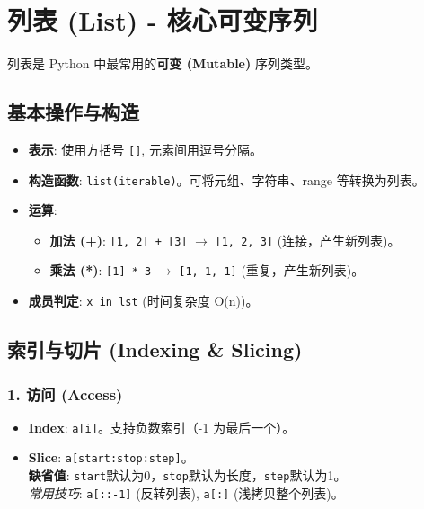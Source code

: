 \documentclass[12pt, a4paper]{article}
\begin{document}
\section{列表 (List) - 核心可变序列}

列表是 Python 中最常用的\textbf{可变 (Mutable)} 序列类型。

\subsection{基本操作与构造}

\begin{itemize}
    \item \textbf{表示}: 使用方括号 \texttt{[]}, 元素间用逗号分隔。
    \item \textbf{构造函数}: \texttt{list(iterable)}。可将元组、字符串、range 等转换为列表。
    \item \textbf{运算}:
    \begin{itemize}
        \item \textbf{加法 (+)}: \texttt{[1, 2] + [3]} $\to$ \texttt{[1, 2, 3]} (连接，产生新列表)。
        \item \textbf{乘法 (*)}: \texttt{[1] * 3} $\to$ \texttt{[1, 1, 1]} (重复，产生新列表)。
    \end{itemize}
    \item \textbf{成员判定}: \texttt{x in lst} (时间复杂度 O(n))。
\end{itemize}

\subsection{索引与切片 (Indexing \& Slicing)}

\subsubsection{1. 访问 (Access)}
\begin{itemize}
    \item \textbf{Index}: \texttt{a[i]}。支持负数索引（-1 为最后一个）。
    \item \textbf{Slice}: \texttt{a[start:stop:step]}。
    \\ \textbf{缺省值}: \texttt{start}默认为0，\texttt{stop}默认为长度，\texttt{step}默认为1。
    \\ \textit{常用技巧}: \texttt{a[::-1]} (反转列表), \texttt{a[:]} (浅拷贝整个列表)。
\end{itemize}

\newpage
\end{document}
